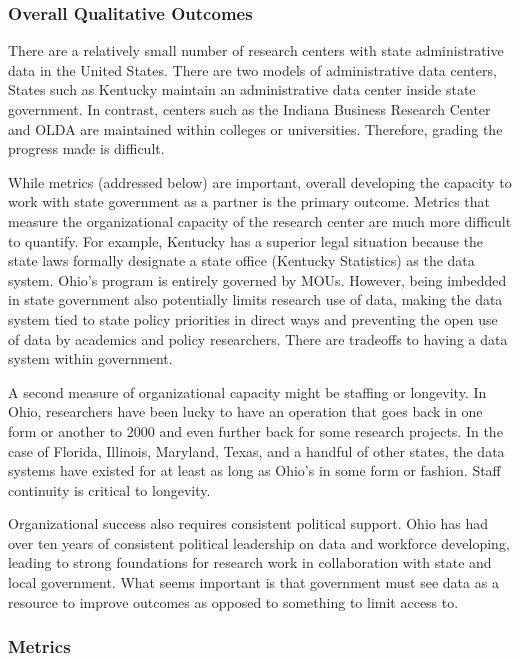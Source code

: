 \documentclass[
]{book}
\begin{document}
\hypertarget{overall-qualitative-outcomes}{%
\subsubsection*{Overall Qualitative Outcomes}\label{overall-qualitative-outcomes}}

There are a relatively small number of research centers with state administrative data in the United States. There are two models of administrative data centers, States such as Kentucky maintain an administrative data center inside state government. In contrast, centers such as the Indiana Business Research Center and OLDA are maintained within colleges or universities. Therefore, grading the progress made is difficult.

While metrics (addressed below) are important, overall developing the capacity to work with state government as a partner is the primary outcome. Metrics that measure the organizational capacity of the research center are much more difficult to quantify. For example, Kentucky has a superior legal situation because the state laws formally designate a state office (Kentucky Statistics) as the data system. Ohio's program is entirely governed by MOUs. However, being imbedded in state government also potentially limits research use of data, making the data system tied to state policy priorities in direct ways and preventing the open use of data by academics and policy researchers. There are tradeoffs to having a data system within government.

A second measure of organizational capacity might be staffing or longevity. In Ohio, researchers have been lucky to have an operation that goes back in one form or another to 2000 and even further back for some research projects. In the case of Florida, Illinois, Maryland, Texas, and a handful of other states, the data systems have existed for at least as long as Ohio's in some form or fashion. Staff continuity is critical to longevity.

Organizational success also requires consistent political support. Ohio has had over ten years of consistent political leadership on data and workforce developing, leading to strong foundations for research work in collaboration with state and local government. What seems important is that government must see data as a resource to improve outcomes as opposed to something to limit access to.

\hypertarget{metrics-1}{%
\subsubsection*{Metrics}\label{metrics-1}}
\end{document}
